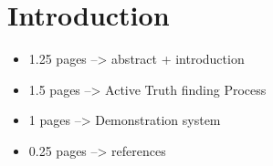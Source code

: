 \section{Introduction}
\begin{itemize}
 \item 1.25 pages --> abstract + introduction
 \item 1.5 pages --> Active Truth finding Process
 \item 1 pages --> Demonstration system
 \item 0.25 pages --> references
\end{itemize}
